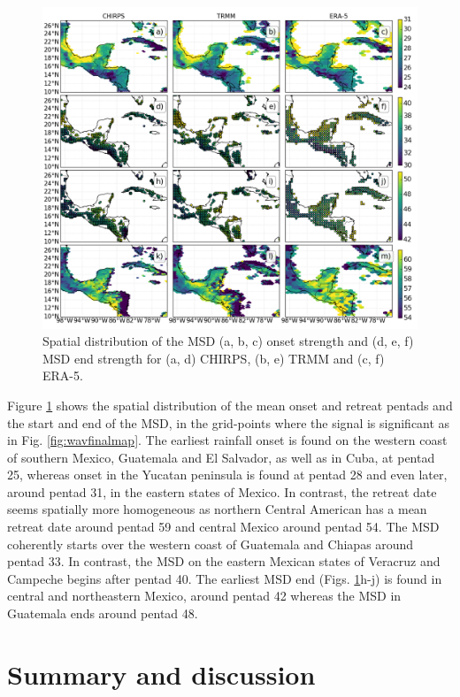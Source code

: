 \begin{figure}
\centering
 \includegraphics[width=\linewidth]{figures/wav_fig13.png}
\caption[Spatial distribution of MSD timings]{  Spatial distribution of the MSD (a, b, c) onset strength and (d, e, f) MSD end strength for (a, d) CHIRPS, (b, e) TRMM and (c, f) ERA-5. }
\label{fig:wav_fig13}
\end{figure}


Figure \ref{fig:wav_fig13} shows the spatial distribution of the mean onset and retreat pentads and the start and end of the MSD, in the grid-points where the signal is significant as in Fig. \ref{fig:wavfinalmap}. The earliest rainfall onset is found on the western coast of southern Mexico, Guatemala and El Salvador, as well as in Cuba, at pentad 25, whereas onset in the Yucatan peninsula is found at pentad 28 and even later, around pentad 31, in the eastern states of Mexico. In contrast, the retreat date seems spatially more homogeneous as northern Central American has a mean retreat date around pentad 59 and central Mexico around pentad 54.
The MSD coherently starts over the western coast of Guatemala and Chiapas around pentad 33. In contrast, the MSD on the eastern Mexican states of Veracruz and Campeche begins after pentad 40. The earliest MSD end (Figs. \ref{fig:wav_fig13}h-j) is found in central and northeastern Mexico, around pentad 42 whereas the MSD in Guatemala ends around pentad 48.



\section{Summary and discussion}

